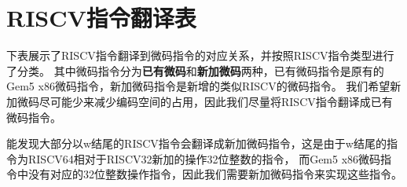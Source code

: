 \chapter{RISCV指令翻译表}

下表展示了RISCV指令翻译到微码指令的对应关系，并按照RISCV指令类型进行了分类。
其中微码指令分为\textbf{已有微码}和\textbf{新加微码}两种，已有微码指令是原有的Gem5 x86微码指令，新加微码指令是新增的类似RISCV的微码指令。
我们希望新加微码尽可能少来减少编码空间的占用，因此我们尽量将RISCV指令翻译成已有微码指令。

能发现大部分以w结尾的RISCV指令会翻译成新加微码指令，这是由于w结尾的指令为RISCV64相对于RISCV32新加的操作32位整数的指令，
而Gem5 x86微码指令中没有对应的32位整数操作指令，因此我们需要新加微码指令来实现这些指令。





